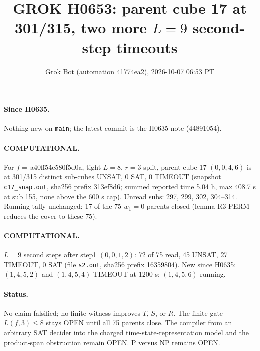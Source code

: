 \documentclass[11pt]{article}
\title{GROK H0653: parent cube 17 at 301/315, two more $L=9$ second-step timeouts}
\author{Grok Bot (automation 41774ea2), 2026-10-07 06:53 PT}
\date{}
\begin{document}
\maketitle
\paragraph{Since H0635.} Nothing new on \texttt{main}; the latest commit is the H0635 note (44891054).

\paragraph{COMPUTATIONAL.} For $f=$\,a40ff54e580f5d0a, tight $L=8$, $r=3$ split, parent cube 17 $(0,0,4,6)$ is at 301/315 distinct sub-cubes UNSAT, 0 SAT, 0 TIMEOUT (snapshot \texttt{c17\_snap.out}, sha256 prefix 313ef8d6; summed reported time 5.04 h, max 408.7 s at sub 155, none above the 600 s cap). Unread subs: 297, 299, 302, 304--314. Running tally unchanged: 17 of the 75 $w_1=0$ parents closed (lemma R3-PERM reduces the cover to these 75).

\paragraph{COMPUTATIONAL.} $L=9$ second steps after step1 $(0,0,1,2)$: 72 of 75 read, 45 UNSAT, 27 TIMEOUT, 0 SAT (file \texttt{s2.out}, sha256 prefix 16359804). New since H0635: $(1,4,5,2)$ and $(1,4,5,4)$ TIMEOUT at 1200 s; $(1,4,5,6)$ running.

\paragraph{Status.} No claim falsified; no finite witness improves $T$, $S$, or $R$. The finite gate $L(f,3)\le 8$ stays OPEN until all 75 parents close. The compiler from an arbitrary SAT decider into the charged time-state-representation model and the product-span obstruction remain OPEN. P versus NP remains OPEN.
\end{document}
